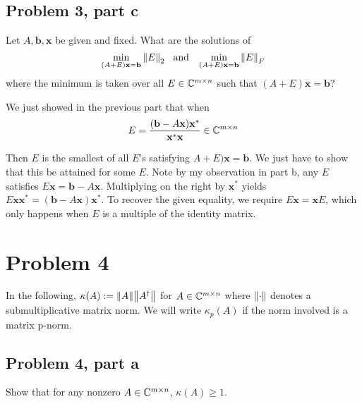 \subsection{Problem 3, part c}
Let $A, \textbf{b}, \textbf{x}$ be given and fixed. What are the solutions of 
\[
    \min_{(A+E)\textbf{x} = \textbf{b}} \norm{E}_2 \hspace{3mm} \text{and} \hspace{3mm} \min_{(A+E)\textbf{x} = \textbf{b}} \norm{E}_F
\]
where the minimum is taken over all $E \in \mathbb{C}^{m\times n}$ such that $(A+E)\textbf{x} = \textbf{b}$?
\partbreak
\begin{solution}

We just showed in the previous part that when 
\[
    E = \frac{(\textbf{b} - A\textbf{x})\textbf{x}^*}{\textbf{x}^*\textbf{x}} \in \mathbb{C}^{m\times n}
\] 

 Then $E$ is the smallest of all $E$'s satisfying $A+E)\textbf{x} = \textbf{b}$. We just have to show that this be attained for some $E$. Note by my observation in part b, any $E$ satisfies $E\textbf{x} = \textbf{b} - A\textbf{x}$. Multiplying on the right by $\textbf{x}^*$ yields $E\textbf{x}\textbf{x}^* = (\textbf{b} - A\textbf{x})\textbf{x}^*$. To recover the given equality, we require $E\textbf{x} = \textbf{x}E$, which only happens when $E$ is a multiple of the identity matrix. 
\end{solution}

\newpage
\section{Problem 4}
In the following, $\kappa(A) := \norm{A}\norm{A^\dag}$ for $A\in \mathbb{C}^{m\times n}$ where $\norm{\cdot}$ denotes a submultiplicative matrix norm. We will write $\kappa_p(A)$ if the norm involved is a matrix p-norm. 

\subsection{Problem 4, part a}
Show that for any nonzero $A \in \mathbb{C}^{m\times n}$, $\kappa(A) \geq 1$.


